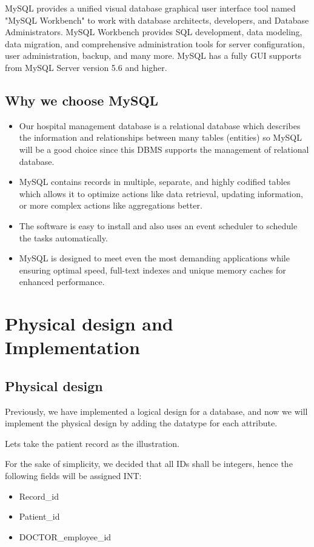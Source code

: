 \documentclass[a4paper]{article}
\numberwithin{equation}{section}
\begin{document}
MySQL provides a unified visual database graphical user interface tool named  "MySQL Workbench" to work with database architects, developers, and Database Administrators. MySQL Workbench provides SQL development, data modeling, data migration, and comprehensive administration tools for server configuration, user administration, backup, and many more. MySQL has a fully GUI supports from MySQL Server version 5.6 and higher.


\subsection{Why we choose MySQL}
\begin{itemize}
  \item Our hospital management database is a relational database which describes the information and relationships between many tables (entities) so MySQL will be a good choice since this DBMS supports the management of relational database.
  \item MySQL contains records in multiple, separate, and highly codified tables which allows it to optimize actions like data retrieval, updating information, or more complex actions like aggregations better.
  \item The software is easy to install and also uses an event scheduler to schedule the tasks automatically.
  \item MySQL is designed to meet even the most demanding applications while ensuring optimal speed, full-text indexes and unique memory caches for enhanced performance.
\end{itemize}

\newpage

\section{Physical design and Implementation}
\subsection{Physical design}
Previously, we have implemented a logical design for a database, and now we will implement the physical design by adding the datatype for each attribute.

Lets take the patient record as the illustration.

For the sake of simplicity, we decided that all IDs shall be integers, hence the following fields will be assigned INT:
\begin{itemize}
  \item Record\_id
  \item Patient\_id
  \item DOCTOR\_employee\_id
\end{itemize}
\end{document}
